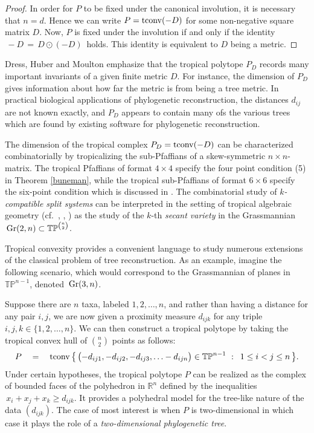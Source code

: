\documentclass[11pt]{amsart}
\newcommand{\RR}{\mathbb{R}}
\newcommand{\TP}{\mathbb{TP}}
\begin{document}
\begin{proof}
In order for $P$ to be fixed under the canonical involution,
it is necessary that $n = d$. Hence we can write
$P = {\rm tconv}(-D)$ for some non-negative square matrix $D$.
Now, $P$ is fixed under the involution if and only if
the identity $\,-D \, = \, D \odot (-D) \,$ holds.
This identity is equivalent to $D$ being a metric.
\end{proof}


Dress, Huber and Moulton \cite{DHM} emphasize that
the tropical polytope $P_D$ records many important
invariants of a given finite metric $D$.
For instance, the dimension of $P_D$
gives information about how far the  metric
is from being a tree metric. In practical biological
applications of phylogenetic reconstruction,
the distances $d_{ij}$ are not known exactly,
and $P_D$ appears to contain many ofs the various trees
which are found by existing  software for
phylogenetic reconstruction.

The dimension of the tropical complex $P_D = {\rm tconv}(-D)$
can be characterized combinatorially
by tropicalizing the sub-Pfaffians of
a skew-symmetric $n \times n$-matrix.
The tropical Pfaffians of format $4 \times 4$
specify the four point condition (5) in Theorem \ref{buneman},
while the tropical sub-Pfaffians of format $6 \times 6$
specify the six-point condition which is discussed in
\cite[page 25]{DHM}. The combinatorial study
of \emph{$k$-compatible split systems} can be interpreted
in the setting of tropical algebraic
geometry (cf.~\cite{Mi}, \cite{RGST}, \cite{SS}) as the study of 
the $k$-th \emph{secant variety} in the  
Grassmannian $\, {\rm Gr}(2,n) \subset
\TP^{\binom{n}{2}}$.

Tropical convexity provides a convenient language
to study numerous extensions of the classical
problem of tree reconstruction. As an example,
imagine the following scenario, which would 
correspond to the Grassmannian of planes in $\TP^{n-1}$,
denoted $\, {\rm Gr}(3,n)$.

Suppose  there are
$n$ taxa, labeled $1,2,\ldots,n$, and rather
than having a distance for any pair $i,j$, we
are now given a proximity measure $d_{ijk}$ for any
triple $i,j,k \in \{1,2,\ldots,n\}$. We can then
construct a tropical polytope by taking the
tropical convex hull of $\binom{n}{2}$ points as follows:
$$ P \quad = \quad {\rm tconv}\,\bigl\{ \,
 \bigl(-d_{ij1}, -d_{ij2}, -d_{ij3}, \ldots-d_{ijn} \bigr)
\in \TP^{n-1} \,\,:\,\,
\, 1 \leq i < j \leq n \,\bigr\}. $$
Under certain hypotheses,
the  tropical polytope $P$ can be realized
as the complex of bounded faces of the
polyhedron in $\RR^n$ defined by the inequalities 
$\,x_i + x_j + x_k \geq d_{ijk}$.
It provides a polyhedral
model for the tree-like nature of the 
 data $(d_{ijk})$. The case of 
most interest is when $P$ is two-dimensional
in which case it plays the role of
a \emph{two-dimensional phylogenetic tree}.
\end{document}
